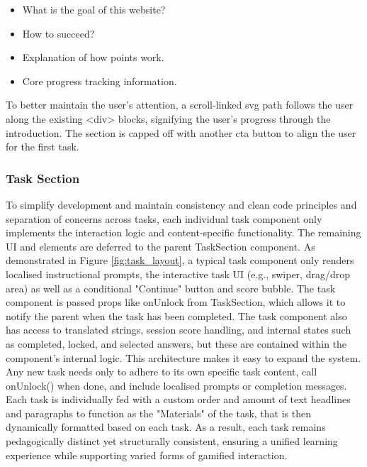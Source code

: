 \begin{itemize}
    \item What is the goal of this website?
    \item How to succeed?
    \item Explanation of how points work.
    \item Core progress tracking information.
\end{itemize}

To better maintain the user's attention, a scroll-linked \acrshort{svg} path follows the user along the existing <div> blocks, signifying the user's progress through the introduction. 
The section is capped off with another \acrshort{cta} button to align the user for the first task.

\subsubsection{Task Section}

To simplify development and maintain consistency and clean code principles and separation of concerns across tasks, each individual task component only implements the interaction logic and content-specific functionality. 
The remaining UI and elements are deferred to the parent TaskSection component. 
As demonstrated in Figure \ref{fig:task_layout}, a typical task component only renders localised instructional prompts, the interactive task UI (e.g., swiper, drag/drop area) as well as a conditional "Continue" button and score bubble. 
The task component is passed props like onUnlock from TaskSection, which allows it to notify the parent when the task has been completed.
The task component also has access to translated strings, session score handling, and internal states such as completed, locked, and selected answers, but these are contained within the component's internal logic.
This architecture makes it easy to expand the system. 
Any new task needs only to adhere to its own specific task content, call onUnlock() when done, and include localised prompts or completion messages. 
Each task is individually fed with a custom order and amount of text headlines and paragraphs to function as the "Materials" of the task, that is then dynamically formatted based on each task.
As a result, each task remains pedagogically distinct yet structurally consistent, ensuring a unified learning experience while supporting varied forms of gamified interaction.


